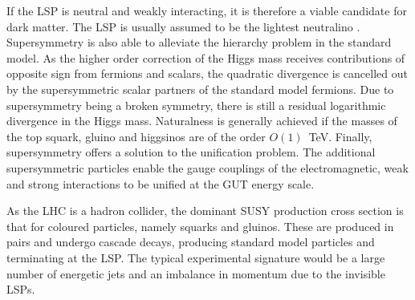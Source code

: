 If the LSP is neutral and weakly interacting, 
it is therefore a viable candidate for dark matter. The LSP is usually assumed 
to be the lightest neutralino \neutralino. 
Supersymmetry is also able to alleviate the hierarchy problem in the standard 
model. As the higher order correction of the Higgs mass receives contributions 
of opposite sign from fermions and scalars, the quadratic divergence is 
cancelled out by 
the supersymmetric scalar partners of the standard model fermions. Due to 
supersymmetry being a broken symmetry, there is still a residual logarithmic 
divergence in the Higgs mass. Naturalness is generally achieved if the masses 
of the top squark, gluino and higgsinos are of the order $O(1)$~TeV. 
Finally, supersymmetry offers a solution to the unification problem. The 
additional supersymmetric particles enable the gauge couplings of the 
electromagnetic, weak and strong interactions to be unified at the GUT energy 
scale.

As the LHC is a hadron collider, the dominant SUSY production cross section is 
that for coloured particles, namely squarks and gluinos. These are produced in 
pairs and undergo cascade decays, producing standard model particles and 
terminating at the LSP. The typical experimental signature would be a large 
number of energetic jets and an imbalance in momentum due to the invisible LSPs.




